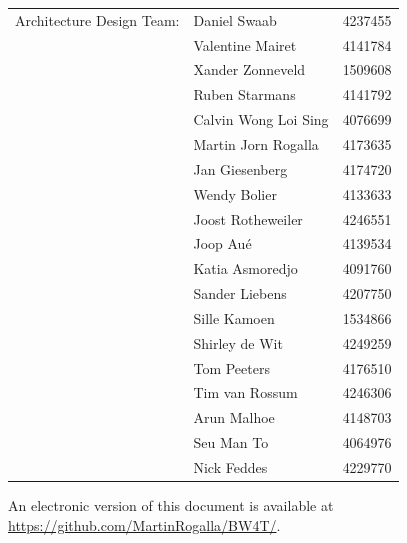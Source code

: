 \begin{titlepage}
\begin{center}
\begin{tabular}{lll}
    Architecture Design Team: & Daniel Swaab & 4237455\\
        & Valentine Mairet     & 4141784\\
        & Xander Zonneveld     & 1509608\\
        & Ruben Starmans       & 4141792\\
        & Calvin Wong Loi Sing & 4076699\\
        & Martin Jorn Rogalla  & 4173635\\
        & Jan Giesenberg       & 4174720\\
        & Wendy Bolier         & 4133633\\
        & Joost Rotheweiler    & 4246551\\
        & Joop Aué             & 4139534\\
        & Katia Asmoredjo      & 4091760\\
        & Sander Liebens       & 4207750\\
        & Sille Kamoen         & 1534866\\
        & Shirley de Wit       & 4249259\\
        & Tom Peeters          & 4176510\\
        & Tim van Rossum       & 4246306\\
        & Arun Malhoe          & 4148703\\
        & Seu Man To           & 4064976\\
        & Nick Feddes          & 4229770
\end{tabular}

\bigskip
\bigskip

\bigskip
\bigskip
An electronic version of this document is available at \url{https://github.com/MartinRogalla/BW4T/}.

\end{center}

\end{titlepage}

